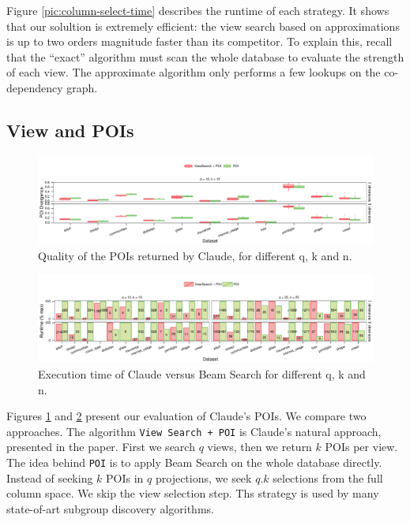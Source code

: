Figure \ref{pic:column-select-time} describes the runtime of each strategy. It
shows that our solultion is extremely efficient: the view search based on
approximations is up to two orders magnitude faster than its competitor. To
explain this, recall that the ``exact'' algorithm must scan the
whole database to evaluate the strength of each view. The approximate algorithm
only performs a few lookups on the co-dependency graph.

\subsection{View and POIs}

\begin{figure}[t!]
\centering
\includegraphics[width=2\columnwidth]{plots/View-POI-Acc}
\caption{Quality of the POIs returned by Claude, for different q, k and n.}
\label{pic:quali-POIs}
\end{figure}
 
\begin{figure}[t!]
\centering
\includegraphics[width=2\columnwidth]{plots/View-POI-Time}
\caption{Execution time of Claude versus Beam Search for different q, k and n.} 
\label{pic:time-POIs}
\end{figure}

Figures \ref{pic:quali-POIs} and \ref{pic:time-POIs} present our evaluation of
Claude's POIs. We compare two approaches. The algorithm \texttt{View Search +
POI} is Claude's natural approach, presented in the paper. First we search $q$
views, then we return $k$ POIs per view. The idea behind \texttt{POI} is to
apply Beam Search on the whole database directly. Instead of seeking $k$ POIs
in $q$ projections, we seek $q.k$ selections from the full column space.  We
skip the view selection step. Ths strategy is used by many state-of-art
subgroup discovery algorithms. 

